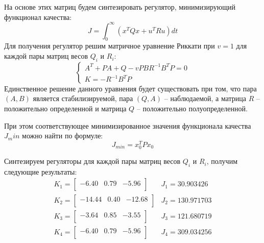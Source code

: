 На основе этих матриц будем синтезировать регулятор, минимизирующий функционал качества:
\begin{equation}
    J = \int_0^\infty \left( x^TQx + u^TRu \right) dt
\end{equation}
Для получения регулятор решим матричное уравнение Риккати при $v = 1$ для каждой пары матриц весов $Q_i$ и $R_i$:
\begin{equation}
    \begin{cases}
        A^T + PA + Q - vPBR^{-1}B^TP = 0 \\ 
        K = -R^{-1}B^TP
    \end{cases}
\end{equation}
Единственное решение данного уравнения будет существовать при том, что пара $(A, B)$ является стабилизируемой, пара $(Q, A)$ -- наблюдаемой, 
а матрица $R$ -- положительно определенной и матрица $Q$ -- положительно полуопределенной.

При этом соответствующее минимизированное значения функционала качества $J_min$ можно найти по формуле:
\begin{equation}
    J_{min} = x_0^TPx_0 
\end{equation}

Синтезируем регуляторы для каждой пары матриц весов $Q_i$ и $R_i$, получим следующие результаты:
\begin{equation}
    \begin{array}{cc}
        K_1 = \begin{bmatrix}
        -6.40  & 0.79  & -5.96 \\ 
        \end{bmatrix} & 
        J_1 = 30.903426 \\ 
        K_2 = \begin{bmatrix}
        -14.44  & 0.40  & -12.68 \\ 
        \end{bmatrix} &
        J_2 = 130.971703 \\
        K_3 = \begin{bmatrix}
        -3.64  & 0.85  & -3.55 \\ 
        \end{bmatrix} &
        J_3 = 121.680719 \\ 
        K_4 = \begin{bmatrix}
        -6.40  & 0.79  & -5.96 \\ 
        \end{bmatrix} &
        J_4 = 309.034256 \\ 
    \end{array}
\end{equation}


